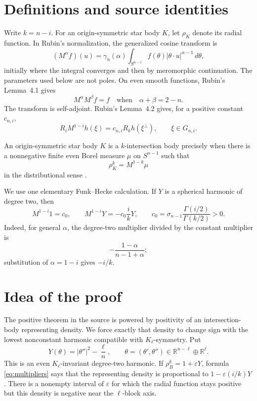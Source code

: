 \documentclass[11pt]{article}
\newcommand{\R}{\mathbb R}
\begin{document}
\section{Definitions and source identities}

Write $k=n-i$.  For an origin-symmetric star body $K$, let $\rho_K$
denote its radial function.  In Rubin's normalization, the generalized cosine
transform is
\[
 (M^\alpha f)(u)=\gamma_n(\alpha)
 \int_{S^{n-1}} f(\theta)|\theta\cdot u|^{\alpha-1}\,d\theta,
\]
initially where the integral converges and then by meromorphic continuation.
The parameters used below are not poles.  On even smooth functions,
Rubin's Lemma~4.1 gives
\begin{equation}\label{eq:inverse}
 M^\alpha M^\beta f=f
 \quad\text{when}\quad \alpha+\beta=2-n.
\end{equation}
The transform is self-adjoint.  Rubin's Lemma~4.2 gives, for a positive
constant $c_{n,i}$,
\begin{equation}\label{eq:intertwine}
 R_iM^{1-i}h(\xi)=c_{n,i}R_kh(\xi^\perp),
 \qquad \xi\in G_{n,i}.
\end{equation}

An origin-symmetric star body $K$ is a $k$-intersection body precisely when
there is a nonnegative finite even Borel measure $\mu$ on $S^{n-1}$ such
that
\begin{equation}\label{eq:intersection}
 \rho_K^k=M^{1-k}\mu
\end{equation}
in the distributional sense \cite[Definition~4.5]{Rubin}.

We use one elementary Funk--Hecke calculation.  If $Y$ is a spherical
harmonic of degree two, then
\begin{equation}\label{eq:multipliers}
 M^{1-i}1=c_0,
 \qquad
 M^{1-i}Y=-c_0\frac{i}{k}Y,
 \qquad
 c_0=\sigma_{n-1}\frac{\Gamma(i/2)}{\Gamma(k/2)}>0.
\end{equation}
Indeed, for general $\alpha$, the degree-two multiplier divided by the
constant multiplier is
\[
 -\frac{1-\alpha}{n-1+\alpha};
\]
substitution of $\alpha=1-i$ gives $-i/k$.

\section{Idea of the proof}

The positive theorem in the source is powered by positivity of an
intersection-body representing density.  We force exactly that density to
change sign with the lowest nonconstant harmonic compatible with
$K_\ell$-symmetry.  Put
\[
 Y(\theta)=|\theta''|^2-\frac\ell n,
 \qquad \theta=(\theta',\theta'')\in
 \R^{n-\ell}\oplus\R^\ell.
\]
This is an even $K_\ell$-invariant degree-two harmonic.  If
$\rho_B^k=1+\varepsilon Y$, formula \eqref{eq:multipliers} says that
the representing density is proportional to
$1-\varepsilon(i/k)Y$.  There is a nonempty interval of $\varepsilon$
for which the radial function stays positive but this density is negative
near the $\ell$-block axis.
\end{document}
